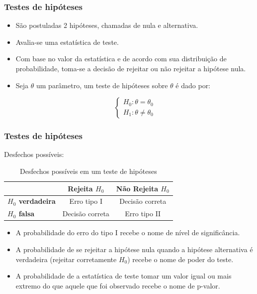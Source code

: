 \documentclass[10pt,
  aspectratio=169,
  serif,
  mathserif,
  professionalfont,
  compress,
  handout,
  ]{beamer}\usepackage[]{graphicx}\usepackage[]{color}
\begin{document}
\begin{frame}
  \frametitle{Testes de hipóteses}
  \begin{itemize}
    \itemsep 2ex
  
  \item São postuladas 2 hipóteses, chamadas de nula e alternativa.
  
  \item Avalia-se uma estatística de teste. 
  
  \item Com base no valor da estatística e de acordo com sua distribuição de probabilidade, toma-se a decisão de rejeitar ou não rejeitar a hipótese nula.
    
  \item Seja $\theta$ um parâmetro, um teste de hipóteses sobre $\theta$ é dado por:
  
  $$
\left\{\begin{matrix}
H_0: \theta = \theta_0 \\ 
H_1: \theta \neq \theta_0
\end{matrix}\right.
$$  
  
  \end{itemize}


\end{frame}


\begin{frame}
  \frametitle{Testes de hipóteses}
  
  Desfechos possíveis:
  
  \begin{table}[]
\begin{tabular}{l|cc}
\hline
\multicolumn{1}{c|}{}    & \textbf{Rejeita $H_0$} & \textbf{Não Rejeita $H_0$} \\ \hline
\textbf{$H_0$ verdadeira} & Erro tipo I           & Decisão correta           \\
\textbf{$H_0$ falsa}      & Decisão correta       & Erro tipo II              \\ \hline
\end{tabular}
\caption{Desfechos possíveis em um teste de hipóteses}
\label{tab:my-table}
\end{table}
  
  \begin{itemize}
    \itemsep 2ex
  
  \item A probabilidade do erro do tipo I recebe o nome de nível de significância.
  
  \item A probabilidade de se rejeitar a hipótese nula quando a hipótese alternativa é verdadeira (rejeitar corretamente $H_0$) recebe o nome de poder do teste.
  
  \item A probabilidade de a estatística de teste tomar um valor igual ou mais extremo do que aquele que foi observado recebe o nome de p-valor.
    
  \end{itemize}

\end{frame}
\end{document}
